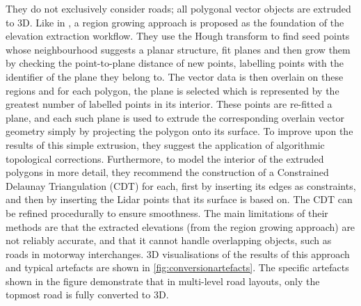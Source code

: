 They do not exclusively consider roads; all polygonal vector objects are extruded to 3D. Like in \cite{hatger_brenner_2003}, a region growing approach is proposed as the foundation of the elevation extraction workflow. They use the Hough transform to find seed points whose neighbourhood suggests a planar structure, fit planes and then grow them by checking the point-to-plane distance of new points, labelling points with the identifier of the plane they belong to. The vector data is then overlain on these regions and for each polygon, the plane is selected which is represented by the greatest number of labelled points in its interior. These points are re-fitted a plane, and each such plane is used to extrude the corresponding overlain vector geometry simply by projecting the polygon onto its surface. To improve upon the results of this simple extrusion, they suggest the application of algorithmic topological corrections. Furthermore, to model the interior of the extruded polygons in more detail, they recommend the construction of a Constrained Delaunay Triangulation (CDT) for each, first by inserting its edges as constraints, and then by inserting the Lidar points that its surface is based on. The CDT can be refined procedurally to ensure smoothness. The main limitations of their methods are that the extracted elevations (from the region growing approach) are not reliably accurate, and that it cannot handle overlapping objects, such as roads in motorway interchanges. 3D visualisations of the results of this approach and typical artefacts are shown in \ref{fig:conversionartefacts}. The specific artefacts shown in the figure demonstrate that in multi-level road layouts, only the topmost road is fully converted to 3D.

